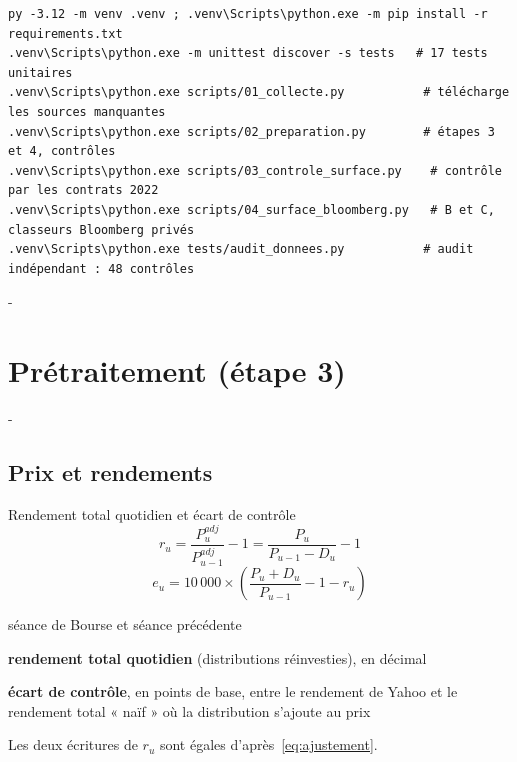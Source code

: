 \documentclass[10pt,a4paper]{article}
\makeatletter
\newcommand{\besoin}[1]{\par\penalty-100\begingroup\setlength{\dimen@}{#1}%
  \dimen@ii\pagegoal\advance\dimen@ii-\pagetotal
  \ifdim\dimen@>\dimen@ii\ifdim\dimen@ii>\z@\vfil\fi\break\fi\endgroup}
\let\sectionorigine\section
\renewcommand{\section}{\besoin{6\baselineskip}\sectionorigine}
\let\soussectionorigine\subsection
\renewcommand{\subsection}{\besoin{5\baselineskip}\soussectionorigine}
\newcommand{\notation}[2]{\makebox[2.3cm][l]{#1}\parbox[t]{\dimexpr\linewidth-2.3cm\relax}{#2}\par}
\makeatother
\begin{document}
\begin{tcolorbox}[enhanced,colback=marine!4,colframe=marine!25,boxrule=0.5pt,arc=2pt,left=6pt,top=2pt,bottom=2pt,fontupper=\footnotesize,
  title={\faIcon{terminal}\enspace Reproduire tout le travail (PowerShell, à la racine du projet, Python 3.12)},fonttitle=\small\bfseries,coltitle=marine,colbacktitle=marine!4,titlerule=0pt,bottomtitle=0pt]
\begin{verbatim}
py -3.12 -m venv .venv ; .venv\Scripts\python.exe -m pip install -r requirements.txt
.venv\Scripts\python.exe -m unittest discover -s tests   # 17 tests unitaires
.venv\Scripts\python.exe scripts/01_collecte.py           # télécharge les sources manquantes
.venv\Scripts\python.exe scripts/02_preparation.py        # étapes 3 et 4, contrôles
.venv\Scripts\python.exe scripts/03_controle_surface.py    # contrôle par les contrats 2022
.venv\Scripts\python.exe scripts/04_surface_bloomberg.py   # B et C, classeurs Bloomberg privés
.venv\Scripts\python.exe tests/audit_donnees.py           # audit indépendant : 48 contrôles
\end{verbatim}
\end{tcolorbox}

\section{Prétraitement (étape 3)}\label{sec:pretraitement}
\subsection{Prix et rendements}
\begin{formule}{Rendement total quotidien et écart de contrôle}
\begin{equation}\label{eq:rendement}
r_u=\frac{P^{adj}_u}{P^{adj}_{u-1}}-1=\frac{P_u}{P_{u-1}-D_u}-1
\end{equation}
\begin{equation}\label{eq:controle}
e_u=10\,000\times\left(\frac{P_u+D_u}{P_{u-1}}-1-r_u\right)
\end{equation}
\notation{$u,\ u-1$}{séance de Bourse et séance précédente}
\notation{$r_u$}{\textbf{rendement total quotidien} (distributions réinvesties), en décimal}
\notation{$e_u$}{\textbf{écart de contrôle}, en points de base, entre le rendement de Yahoo et le rendement total « naïf » où la distribution s'ajoute au prix}
\end{formule}
Les deux écritures de $r_u$ sont égales d'après~\eqref{eq:ajustement}.
\end{document}
